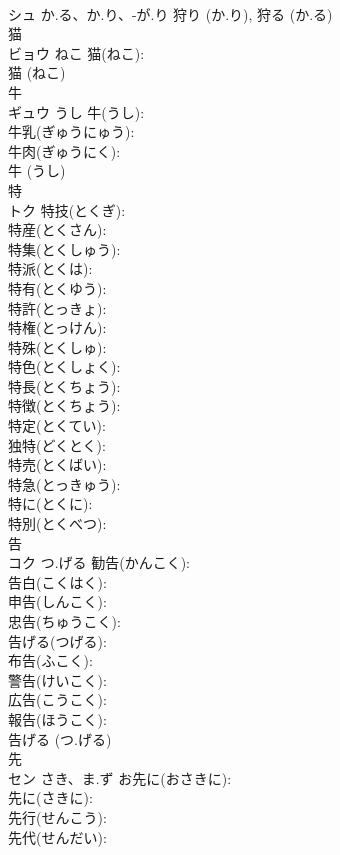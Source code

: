 \documentclass[8pt]{extreport}
\begin{document}
\begin{CJK}{UTF8}{min}
\\	シュ	か.る、か.り、-が.り		狩り (か.り), 狩る (か.る)
\\	猫			
\\	ビョウ	ねこ	猫(ねこ): 
\\	猫 (ねこ)
\\	牛			
\\	ギュウ	うし	牛(うし): 
\\	牛乳(ぎゅうにゅう): 
\\	牛肉(ぎゅうにく): 
\\	牛 (うし)
\\	特			
\\	トク		特技(とくぎ): 
\\	特産(とくさん): 
\\	特集(とくしゅう): 
\\	特派(とくは): 
\\	特有(とくゆう): 
\\	特許(とっきょ): 
\\	特権(とっけん): 
\\	特殊(とくしゅ): 
\\	特色(とくしょく): 
\\	特長(とくちょう): 
\\	特徴(とくちょう): 
\\	特定(とくてい): 
\\	独特(どくとく): 
\\	特売(とくばい): 
\\	特急(とっきゅう): 
\\	特に(とくに): 
\\	特別(とくべつ): 
\\	告			
\\	コク	つ.げる	勧告(かんこく): 
\\	告白(こくはく): 
\\	申告(しんこく): 
\\	忠告(ちゅうこく): 
\\	告げる(つげる): 
\\	布告(ふこく): 
\\	警告(けいこく): 
\\	広告(こうこく): 
\\	報告(ほうこく): 
\\	告げる (つ.げる)
\\	先			
\\	セン	さき、ま.ず	お先に(おさきに): 
\\	先に(さきに): 
\\	先行(せんこう): 
\\	先代(せんだい): 

\end{CJK}
\end{document}
